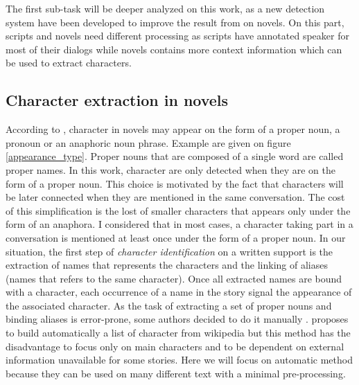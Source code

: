 \documentclass[a4paper, 12pt]{report}
\begin{document}
The first sub-task will be deeper analyzed on this work, as a new detection system have been developed to improve the result from \cite{original} on novels. On this part, scripts and novels need different processing as scripts have annotated speaker for most of their dialogs while novels contains more context information which can be used to extract characters.  


\subsection{Character extraction in novels}
According to \cite{fiction},  character in novels may appear on the form of a proper noun, a pronoun or an anaphoric noun phrase. Example are given on figure \ref{appearance_type}. Proper nouns that are composed of a single word are called proper names. In this work, character are only detected when they are on the form of a proper noun. This choice is motivated by the fact that characters will be later connected when they are mentioned in the same conversation. The cost of this simplification is the lost of smaller characters that appears only under the form of an anaphora. I considered that in most cases, a character taking part in a conversation is mentioned at least once under the form of a proper noun. In our situation, the first step of \textit{character identification} on a written support is the extraction of names that represents the characters and the linking of aliases (names that refers to the same character). Once all extracted names are bound with a character, each occurrence of a name in the story signal the appearance of the associated character. As the task of extracting a set of proper nouns and binding aliases is error-prone, some authors decided to do it manually \citep{agarwal-etal-2013-automatic}.  \cite{he-etal-2013-identification} proposes to build automatically a list of character from wikipedia but this method has the disadvantage to focus only on main characters and to be dependent on external information unavailable for some stories.  Here we will focus on automatic method because they can be used on many different text with a minimal pre-processing.\\

\begin{table}
\center
{}\\
\caption{Different type of characters appearance}\label{appearance_type}
\end{table}
\end{document}

